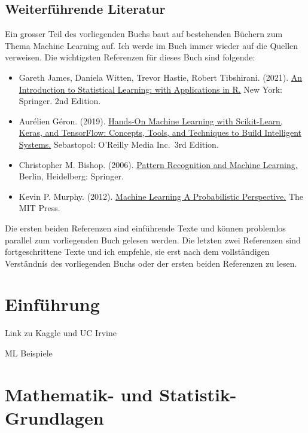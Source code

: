 \documentclass[
]{book}
\providecommand{\tightlist}{%
  \setlength{\itemsep}{0pt}\setlength{\parskip}{0pt}}
\begin{document}
\hypertarget{weiterfuxfchrende-literatur}{%
\section*{Weiterführende Literatur}\label{weiterfuxfchrende-literatur}}

Ein grosser Teil des vorliegenden Buchs baut auf bestehenden Büchern zum Thema Machine Learning auf. Ich werde im Buch immer wieder auf die Quellen verweisen. Die wichtigsten Referenzen für dieses Buch sind folgende:

\begin{itemize}
\tightlist
\item
  Gareth James, Daniela Witten, Trevor Hastie, Robert Tibshirani. (2021). \href{https://www.statlearning.com/}{An Introduction to Statistical Learning: with Applications in R.} New York: Springer. 2nd Edition.
\item
  Aurélien Géron. (2019). \href{https://www.oreilly.com/library/view/hands-on-machine-learning/9781098125967/}{Hands-On Machine Learning with Scikit-Learn, Keras, and TensorFlow: Concepts, Tools, and Techniques to Build Intelligent Systems.} Sebastopol: O'Reilly Media Inc.~3rd Edition.
\item
  Christopher M. Bishop. (2006). \href{https://link.springer.com/book/9780387310732}{Pattern Recognition and Machine Learning.} Berlin, Heidelberg: Springer.
\item
  Kevin P. Murphy. (2012). \href{https://mitpress.mit.edu/9780262018029/machine-learning/}{Machine Learning A Probabilistic Perspective.} The MIT Press.
\end{itemize}

Die ersten beiden Referenzen sind einführende Texte und können problemlos parallel zum vorliegenden Buch gelesen werden. Die letzten zwei Referenzen sind fortgeschrittene Texte und ich empfehle, sie erst nach dem vollständigen Verständnis des vorliegenden Buchs oder der ersten beiden Referenzen zu lesen.

\hypertarget{intro}{%
\chapter{Einführung}\label{intro}}

Link zu Kaggle und UC Irvine

ML Beispiele

\hypertarget{basics}{%
\chapter{Mathematik- und Statistik-Grundlagen}\label{basics}}
\end{document}
